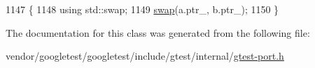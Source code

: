 \begin{DoxyCode}
1147                                                  \{
1148     \textcolor{keyword}{using} std::swap;
1149     \hyperlink{classtesting_1_1internal_1_1scoped__ptr_a01bc0441e6a3ebf26807ac523392ca86}{swap}(a.ptr\_, b.ptr\_);
1150   \}
\end{DoxyCode}


The documentation for this class was generated from the following file\+:\begin{DoxyCompactItemize}
\item 
vendor/googletest/googletest/include/gtest/internal/\hyperlink{gtest-port_8h}{gtest-\/port.\+h}\end{DoxyCompactItemize}
